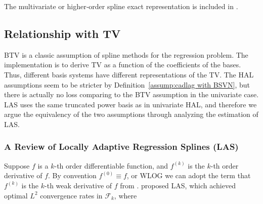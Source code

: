 The multivariate or higher‑order spline exact representation is included in \citet[Section 3]{vanderlaan2023higherordersplinehighly}. 

\subsection{Relationship with TV} \label{Relationship with TV}

BTV is a classic assumption of spline methods for the regression problem. The implementation is to derive TV as a function of the coefficients of the bases. Thus, different basis systems have different representations of the TV. The HAL assumptions seem to be stricter by Definition~\ref{assump:cadlag with BSVN}, but there is actually no loss comparing to the BTV assumption in the univariate case. LAS uses the same truncated power basis as in univariate HAL, and therefore we argue the equivalency of the two assumptions through analyzing the estimation of LAS.

\subsubsection{A Review of Locally Adaptive Regression Splines (LAS)}
Suppose $f$ is a $k$-th order differentiable function, and $f^{(k)}$ is the $k$-th order derivative of $f$. By convention $f^{(0)} \equiv f$, or WLOG we can adopt the term that $f^{(k)}$ is the $k$-th weak derivative of $f$ from \citet{tibshirani2014adaptive}.
\citet{mammen1997locally} proposed LAS, which  achieved optimal $L^2$ convergence rates in $\mathcal{F}_k$, where 

